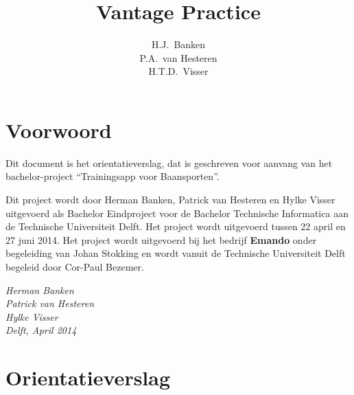 \documentclass[dutch]{style/tudelft-report}
\begin{document}

\frontmatter

\title[Bachelorproject \\ ~ \\ Orientatieverslag]{Vantage Practice}
\author{H.J.\ Banken \\ P.A.\ van Hesteren \\ H.T.D.\ Visser}



\chapter{Voorwoord}
Dit document is het orientatieverslag, dat is geschreven voor aanvang van het bachelor-project “Trainingsapp voor Baansporten”. 

\bigskip

\noindent
Dit project wordt door Herman Banken, Patrick van Hesteren en Hylke Visser uitgevoerd als Bachelor Eindproject voor de Bachelor Technische Informatica aan de Technische Universiteit Delft. Het project wordt uitgevoerd tussen 22 april en 27 juni 2014. Het project wordt uitgevoerd bij het bedrijf \textbf{Emando} onder begeleiding van Johan Stokking en wordt vanuit de Technische Universiteit Delft begeleid door Cor-Paul Bezemer.

\bigskip

\begin{flushright}
{\makeatletter\itshape
    Herman Banken \\
    Patrick van Hesteren \\
    Hylke Visser \\
    Delft, April 2014
\makeatother}
\end{flushright}

\tableofcontents

\mainmatter

\chapter{Orientatieverslag} \label{ch:orientatie} 

\appendix



\end{document}
